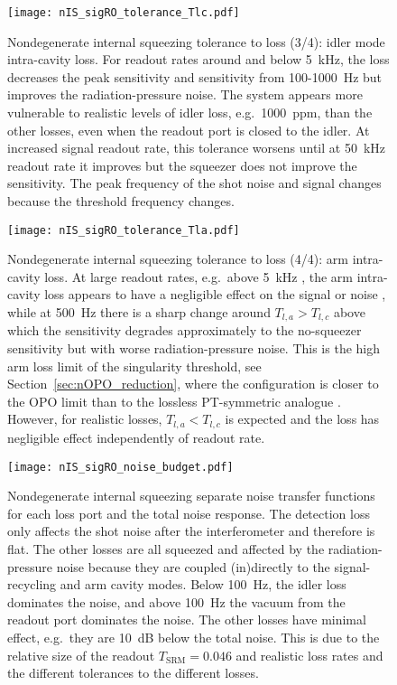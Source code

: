 \begin{figure}
    \centering
    \texttt{[image: nIS\_sigRO\_tolerance\_Tlc.pdf]}
    \caption{ Nondegenerate internal squeezing tolerance to loss (3/4): idler mode intra-cavity loss. For readout rates around and below 5~kHz, the loss decreases the peak sensitivity and sensitivity from 100-1000~Hz but improves the radiation-pressure noise. The system appears more vulnerable to realistic levels of idler loss, e.g.\ 1000~ppm, than the other losses, even when the readout port is closed to the idler. At increased signal readout rate, this tolerance worsens until at 50~kHz readout rate it improves  but the squeezer does not improve the sensitivity. The peak frequency of the shot noise and signal changes because the threshold frequency changes.}
    \label{fig:nIS_sigRO_tolerance_Tlc}
\end{figure}
\begin{figure}
    \centering
    \texttt{[image: nIS\_sigRO\_tolerance\_Tla.pdf]}
    \caption{ Nondegenerate internal squeezing tolerance to loss (4/4): arm intra-cavity loss. At large readout rates, e.g.\ above 5~kHz , the arm intra-cavity loss appears to have a negligible effect on the signal or noise , while at 500~Hz there is a sharp change around $T_{l,a}>T_{l,c}$  above which the sensitivity degrades approximately to the no-squeezer sensitivity  but with worse radiation-pressure noise. This is the high arm loss limit of the singularity threshold, see Section~\ref{sec:nOPO_reduction}, where the configuration is closer to the OPO limit than to the lossless PT-symmetric analogue . However, for realistic losses, $T_{l,a}<T_{l,c}$ is expected and the loss has negligible effect  independently of readout rate.}
    \label{fig:nIS_sigRO_tolerance_Tla}
\end{figure}
\begin{figure}
    \centering
    \texttt{[image: nIS\_sigRO\_noise\_budget.pdf]}
    \caption{ Nondegenerate internal squeezing separate noise transfer functions for each loss port and the total noise response. The detection loss only affects the shot noise after the interferometer and therefore is flat. The other losses are all squeezed and affected by the radiation-pressure noise because they are coupled (in)directly to the signal-recycling and arm cavity modes. Below 100~Hz, the idler loss dominates the noise, and above 100~Hz the vacuum from the readout port dominates the noise. The other losses have minimal effect, e.g.\ they are 10~dB below the total noise. This is due to the relative size of the readout $T_\text{SRM}=0.046$ and realistic loss rates and the different tolerances to the different losses.}
    \label{fig:nIS_sigRO_noise_budget}
\end{figure}

